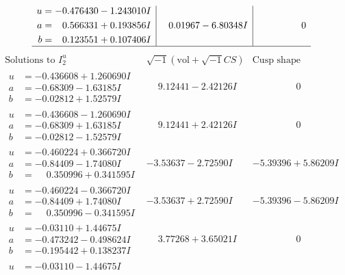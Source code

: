 \documentclass[1p]{elsarticle_modified}
\theoremstyle{definition}
\newcommand{\I}{\sqrt{-1}}
\begin{document}
$$\begin{array}{c|c|c}
\begin{aligned}
u &= -0.476430 - 1.243010 I \\
a &= \phantom{-}0.566331 + 0.193856 I \\
b &= \phantom{-}0.123551 + 0.107406 I\end{aligned}
 & \phantom{-}0.01967 - 6.80348 I & \phantom{-0.000000 } 0\\
 \hline 
 \end{array}$$\newpage$$\begin{array}{c|c|c}  
\text{Solutions to }I^u_{2}& \I (\text{vol} + \sqrt{-1}CS) & \text{Cusp shape}\\
 \hline 
\begin{aligned}
u &= -0.436608 + 1.260690 I \\
a &= -0.68309 - 1.63185 I \\
b &= -0.02812 + 1.52579 I\end{aligned}
 & \phantom{-}9.12441 - 2.42126 I & \phantom{-0.000000 } 0 \\ \hline\begin{aligned}
u &= -0.436608 - 1.260690 I \\
a &= -0.68309 + 1.63185 I \\
b &= -0.02812 - 1.52579 I\end{aligned}
 & \phantom{-}9.12441 + 2.42126 I & \phantom{-0.000000 } 0 \\ \hline\begin{aligned}
u &= -0.460224 + 0.366720 I \\
a &= -0.84409 - 1.74080 I \\
b &= \phantom{-}0.350996 + 0.341595 I\end{aligned}
 & -3.53637 - 2.72590 I & -5.39396 + 5.86209 I \\ \hline\begin{aligned}
u &= -0.460224 - 0.366720 I \\
a &= -0.84409 + 1.74080 I \\
b &= \phantom{-}0.350996 - 0.341595 I\end{aligned}
 & -3.53637 + 2.72590 I & -5.39396 - 5.86209 I \\ \hline\begin{aligned}
u &= -0.03110 + 1.44675 I \\
a &= -0.473242 - 0.498624 I \\
b &= -0.195442 + 0.138237 I\end{aligned}
 & \phantom{-}3.77268 + 3.65021 I & \phantom{-0.000000 } 0 \\ \hline\begin{aligned}
u &= -0.03110 - 1.44675 I \\

\end{aligned}
\end{array}$$
\end{document}

